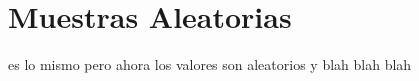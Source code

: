 \documentclass[10pt,a4paper]{article} %
\begin{document}
    \section{Muestras Aleatorias}
        es lo mismo pero ahora los valores son aleatorios y blah blah blah



















    \nocite{*}
    
    
\end{document}
